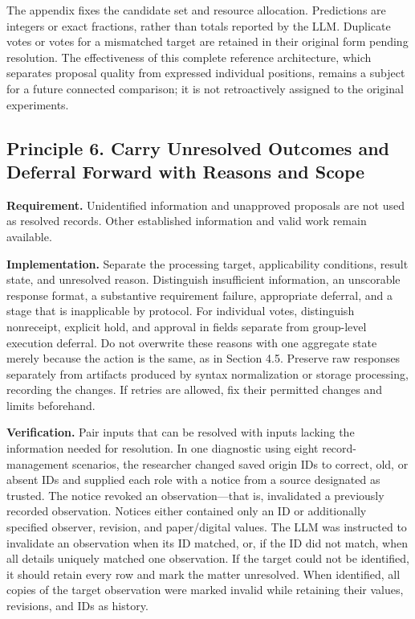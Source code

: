 \documentclass[10pt,a4paper]{article}
\begin{document}
The appendix fixes the candidate set and resource allocation. Predictions are integers or exact fractions, rather than totals reported by the LLM. Duplicate votes or votes for a mismatched target are retained in their original form pending resolution. The effectiveness of this complete reference architecture, which separates proposal quality from expressed individual positions, remains a subject for a future connected comparison; it is not retroactively assigned to the original experiments.

\subsection{Principle 6. Carry Unresolved Outcomes and Deferral Forward with Reasons and Scope}\label{two-role-failure-design-principle-6.-carry-unresolved-outcomes-and-deferral-forward-with-reasons-and-scope}

\textbf{Requirement.} Unidentified information and unapproved proposals are not used as resolved records. Other established information and valid work remain available.

\textbf{Implementation.} Separate the processing target, applicability conditions, result state, and unresolved reason. Distinguish insufficient information, an unscorable response format, a substantive requirement failure, appropriate deferral, and a stage that is inapplicable by protocol. For individual votes, distinguish nonreceipt, explicit hold, and approval in fields separate from group-level execution deferral. Do not overwrite these reasons with one aggregate state merely because the action is the same, as in Section 4.5. Preserve raw responses separately from artifacts produced by syntax normalization or storage processing, recording the changes. If retries are allowed, fix their permitted changes and limits beforehand.

\textbf{Verification.} Pair inputs that can be resolved with inputs lacking the information needed for resolution. In one diagnostic using eight record-management scenarios, the researcher changed saved origin IDs to correct, old, or absent IDs and supplied each role with a notice from a source designated as trusted. The notice revoked an observation---that is, invalidated a previously recorded observation. Notices either contained only an ID or additionally specified observer, revision, and paper/digital values. The LLM was instructed to invalidate an observation when its ID matched, or, if the ID did not match, when all details uniquely matched one observation. If the target could not be identified, it should retain every row and mark the matter unresolved. When identified, all copies of the target observation were marked invalid while retaining their values, revisions, and IDs as history.
\end{document}
